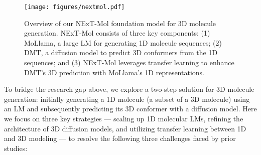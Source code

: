 \begin{figure}[t]
    \centering
    \texttt{[image: figures/nextmol.pdf]}
    \vspace{-1mm}
    \caption{Overview of our NExT-Mol foundation model for 3D molecule generation. NExT-Mol consists of three key components: (1) MoLlama, a large LM for generating 1D molecule sequences; (2) DMT, a diffusion model to predict 3D conformers from the 1D sequences; and (3) NExT-Mol leverages transfer learning to enhance DMT's 3D prediction with MoLlama's 1D representations.}
    \label{fig:nextmol}
    \vspace{-3mm}
\end{figure}


To bridge the research gap above, we explore a two-step solution for 3D molecule generation: initially generating a 1D molecule (a subset of a 3D molecule) using an LM and subsequently predicting its 3D conformer with a diffusion model.
Here we focus on three key strategies --- scaling up 1D molecular LMs, refining the architecture of 3D diffusion models, and utilizing transfer learning between 1D and 3D modeling --- to resolve the following three challenges faced by prior studies:
\vspace{-2mm}
